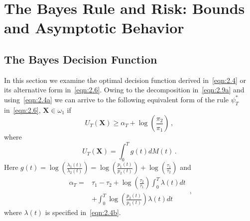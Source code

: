 \documentclass[lettersize,journal,onecolumn]{IEEEtran}
\theoremstyle{definition}
\begin{document}
\section{The Bayes Rule and Risk: Bounds and Asymptotic Behavior}
\label{sec:03_bayes_bounds}

\subsection{The Bayes Decision Function}
\label{subsec:03_bayes_bounds/decision}

\noindent In this section we examine the optimal decision function derived 
in~\eqref{eqn:2.4} or 
its alternative form in~\eqref{eqn:2.6}. Owing to the decomposition 
in~\eqref{eqn:2.9a} and using~\eqref{eqn:2.4a} we can arrive to the following 
equivalent form of the rule $\psi_{T}^{*}$ in~\eqref{eqn:2.6}, 
$\mathbf{X}\in\omega_{1}$ if
\begin{equation}
	U_{T}(\mathbf{X}) \geq
	\alpha_{T} + \log\left(\frac{\pi_{2}}{\pi_{1}}\right)
	\label{eqn:3.1} \,,
\end{equation}
where
\begin{equation}
	U_{T}(\mathbf{X}) =
	\int_{0}^{T} g(t)dM(t)
	\label{eqn:3.2} \,.
\end{equation}
Here $
g(t) = 
\log\left(\frac{\lambda_{1}(t)}{\lambda_{2}(t)}\right) =
\log\left(\frac{p_{1}(t)}{p_{2}(t)}\right) + \log\left(\frac{\tau_{1}}{\tau_{2}}\right)
$ and
\begin{equation}
	\begin{split}
		\alpha_{T} = {}
		& \tau_{1} - \tau_{2} + \log\left(\frac{\tau_{2}}{\tau_{1}}\right)
		\int_{0}^{T} \lambda(t)dt \\
		&+ \int_{0}^{T} \log\left(\frac{p_{2}(t)}{p_{1}(t)}\right) \lambda(t)dt
	\end{split}
	\label{eqn:3.3} \,,
\end{equation}
where $\lambda(t)$ is specified in~\eqref{eqn:2.4b}.
\end{document}
